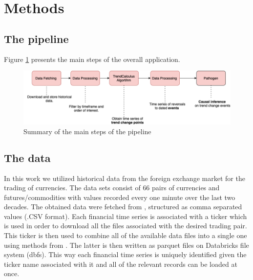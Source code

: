 \documentclass[a4, 11pt]{article}
\begin{document}
\section{Methods}
\subsection{The pipeline}
Figure \ref{fig:pipeline} presents the main steps of the overall application.  
\vspace{0.2in}
\begin{figure}[!ht]
    \centering
    \includegraphics[width=1\textwidth]{Images/Pipeline.png}
    \caption{Summary of the main steps of the pipeline}
    \label{fig:pipeline}
\end{figure}
 
 
\subsection{The data}
In this work we utilized historical data from the foreign exchange market \cite{Forex} for the trading of currencies. The data sets consist of $66$ pairs of currencies and futures/commodities with values recorded every one minute over the last two decades. The obtained data were fetched from \cite{HistData}, structured as comma separated values (.CSV format). Each financial time series is associated with a ticker which is used in order to download all the files associated with the desired trading pair. This ticker is then used to combine all of the available data files into a single one using methods from \cite{FX1}. The latter is then written as parquet files on Databricks file system (dbfs). This way each financial time series is uniquely identified given the ticker name associated with it and all of the relevant records can be loaded at once. 
\end{document}
